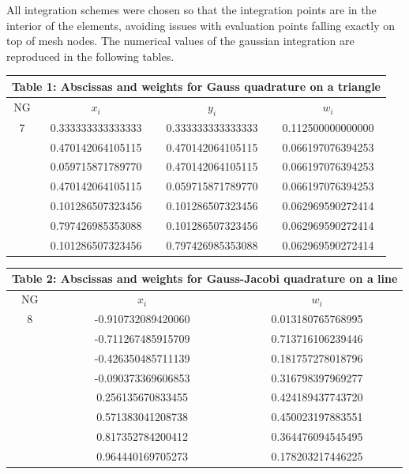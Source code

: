 \documentclass[12pt]{report}
\begin{document}
All integration schemes were chosen so that the integration points are in the interior of the elements, avoiding issues with evaluation points falling exactly on top of mesh nodes. The numerical values of the gaussian integration are reproduced in the following tables.

\pagebreak
\begin{center}
\begin{tabular}{|c|c|c|c|}
\multicolumn{4}{c}{Table 1: Abscissas and weights for Gauss quadrature on a triangle}\\
\hline
NG & $x_i$ & $y_i$ & $w_i$\\
\hline\hline
7 & 0.333333333333333 & 0.333333333333333 & 0.112500000000000\\
 & 0.470142064105115 & 0.470142064105115 & 0.066197076394253\\
 & 0.059715871789770 & 0.470142064105115 & 0.066197076394253\\
 & 0.470142064105115 & 0.059715871789770 & 0.066197076394253\\
 & 0.101286507323456 & 0.101286507323456 & 0.062969590272414\\
 & 0.797426985353088 & 0.101286507323456 & 0.062969590272414\\
 & 0.101286507323456 & 0.797426985353088 & 0.062969590272414\\
\hline
\end{tabular}
\end{center}

\begin{center}
\begin{tabular}{|c|c|c|}
\multicolumn{3}{c}{Table 2: Abscissas and weights for Gauss-Jacobi quadrature on a line}\\
\hline
NG & $x_i$ & $w_i$\\
\hline\hline
8 & -0.910732089420060 & 0.013180765768995\\
 & -0.711267485915709 & 0.713716106239446\\
 & -0.426350485711139 & 0.181757278018796\\
 & -0.090373369606853 & 0.316798397969277\\
 & 0.256135670833455 & 0.424189437743720\\
 & 0.571383041208738 & 0.450023197883551\\
 & 0.817352784200412 & 0.364476094545495\\
 & 0.964440169705273 & 0.178203217446225\\
\hline
\end{tabular}
\end{center}
\end{document}
